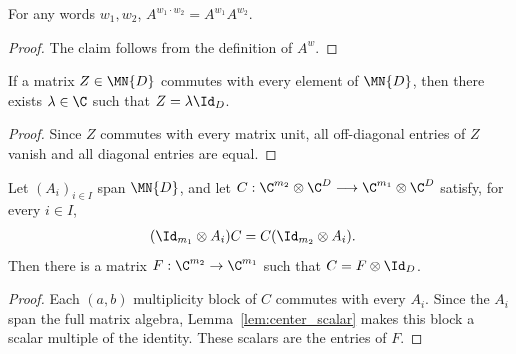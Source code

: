 \begin{lemma}\label{lem:eval_word_append}
    \leanok
    For any words $w_1, w_2$,
    $A^{w_1 \cdot w_2} = A^{w_1} A^{w_2}$.
\end{lemma}

\begin{proof}\leanok
    The claim follows from the definition of $A^w$.
\end{proof}

\begin{lemma}[Centre of $\MN{D}$]\label{lem:center_scalar}
    \leanok
    If a matrix $Z \in \MN{D}$ commutes with every element of $\MN{D}$, then
    there exists $\lambda \in \C$ such that $Z = \lambda \Id_D$.
\end{lemma}

\begin{proof}\leanok
    Since $Z$ commutes with every matrix unit, all off-diagonal entries of $Z$
    vanish and all diagonal entries are equal.
\end{proof}

\begin{lemma}
    \label{lem:amplified_center_scalar}
    \leanok
    Let $(A_i)_{i\in I}$ span $\MN{D}$, and let
    $C:\C^{m_2}\otimes\C^D\longrightarrow\C^{m_1}\otimes\C^D$ satisfy, for
    every $i\in I$,
    \begin{align}
        (\Id_{m_1}\otimes A_i)C
         & =C(\Id_{m_2}\otimes A_i).
        \notag
    \end{align}
    Then there is a matrix $F:\C^{m_2}\to\C^{m_1}$ such that
    $C=F\otimes\Id_D$.
\end{lemma}

\begin{proof}\leanok
    Each $(a,b)$ multiplicity block of $C$ commutes with every $A_i$.
    Since the $A_i$ span the full matrix algebra,
    Lemma~\ref{lem:center_scalar} makes this block a scalar multiple of the
    identity. These scalars are the entries of $F$.
\end{proof}

